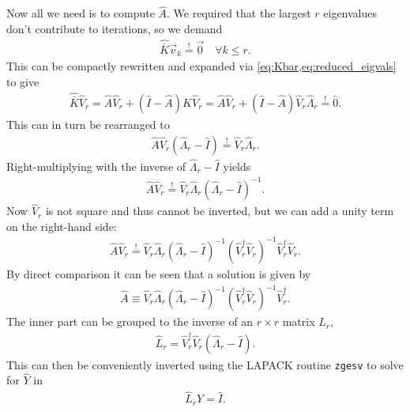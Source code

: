 Now all we need is to compute $\hat{A}$. We required that the largest $r$ eigenvalues don't contribute to iterations, so we demand
\begin{gather}
  \hat{\bar{K}} \vec{v}_{k} \overset{!}{=} \vec{0} \quad \forall k \le r.
\end{gather}
This can be compactly rewritten and expanded via \cref{eq:Kbar,eq:reduced_eigvals} to give
\begin{gather}
  \hat{\bar{K}} \hat{V}_{r} = \hat{A} \hat{V}_{r} + \left ( \hat{I} - \hat{A} \right ) \hat{K} \hat{V}_{r} = \hat{A} \hat{V}_{r} + \left ( \hat{I} - \hat{A} \right ) \hat{V}_{r} \hat{\Lambda}_{r} \overset{!}{=} \hat{0}.
\end{gather}
This can in turn be rearranged to
\begin{gather}
  \hat{A} \hat{V}_{r} \left ( \hat{\Lambda}_{r} - \hat{I} \right ) \overset{!}{=} \hat{V}_{r} \hat{\Lambda}_{r}.
\end{gather}
Right-multiplying with the inverse of $\hat{\Lambda}_{r} - \hat{I}$ yields
\begin{gather}
  \hat{A} \hat{V}_{r} \overset{!}{=} \hat{V}_{r} \hat{\Lambda}_{r} \left ( \hat{\Lambda}_{r} - \hat{I} \right )^{-1}.
\end{gather}
Now $\hat{V}_{r}$ is not square and thus cannot be inverted, but we can add a unity term on the right-hand side:
\begin{gather}
  \hat{A} \hat{V}_{r} \overset{!}{=} \hat{V}_{r} \hat{\Lambda}_{r} \left ( \hat{\Lambda}_{r} - \hat{I} \right )^{-1} \left ( \hat{V}_{r}^{\dagger} \hat{V}_{r} \right )^{-1} \hat{V}_{r}^{\dagger} \hat{V}_{r}.
\end{gather}
By direct comparison it can be seen that a solution is given by
\begin{gather}
  \hat{A} \equiv \hat{V}_{r} \hat{\Lambda}_{r} \left ( \hat{\Lambda}_{r} - \hat{I} \right )^{-1} \left ( \hat{V}_{r}^{\dagger} \hat{V}_{r} \right )^{-1} \hat{V}_{r}^{\dagger}.
\end{gather}
The inner part can be grouped to the inverse of an $r \times r$ matrix $\hat{L}_{r}$,
\begin{gather}
  \hat{L}_{r} = \hat{V}_{r}^{\dagger} \hat{V}_{r} \left ( \hat{\Lambda}_{r} - \hat{I} \right ).
\end{gather}
This can then be conveniently inverted using the LAPACK routine \texttt{zgesv} to solve for $\hat{Y}$ in
\begin{gather}
  \hat{L}_{r} \hat{Y} = \hat{I}.
\end{gather}
